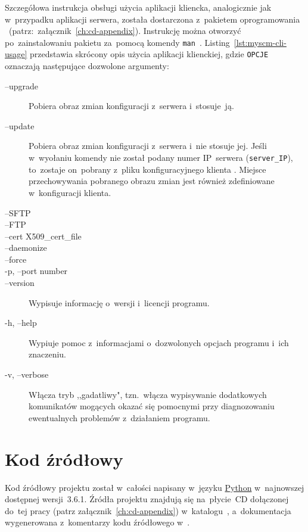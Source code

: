 \documentclass[thesis]{subfiles}
\begin{document}
Szczegółowa instrukcja obsługi użycia aplikacji kliencka, analogicznie jak w~przypadku aplikacji serwera, została dostarczona z~pakietem oprogramowania \texttt{\cliappname}~(patrz:~załącznik~\ref{ch:cd-appendix}). Instrukcję można otworzyć po~zainstalowaniu pakietu \texttt{\cliappname} za~pomocą komendy \texttt{man~\cliappname}. Listing~\ref{lst:myscm-cli-usage} przedstawia skrócony opis użycia aplikacji klienckiej, gdzie \texttt{OPCJE} oznaczają następujące dozwolone argumenty:\mynobreakpar
\begin{description}
	\item[--upgrade] Pobiera obraz zmian konfiguracji z~serwera i~stosuje~ją.
	\item[--update] Pobiera obraz zmian konfiguracji z~serwera i~nie stosuje jej. Jeśli w~wyołaniu komendy \texttt{\cliappname} nie został podany numer IP~serwera (\texttt{server\_IP}), to~zostaje on~pobrany z~pliku konfiguracyjnego klienta \myscmcliconfig. Miejsce przechowywania pobranego obrazu zmian jest również zdefiniowane w~konfiguracji klienta.
	\item[--SFTP]
	\item[--FTP]
	\item[--cert X509\_cert\_file]
	\item[--daemonize]
	\item[--force]
	\item[-p, --port number]
	\item[--version] Wypisuje informację o~wersji i~licencji programu.
	\item[-h, --help] Wypiuje pomoc z~informacjami o~dozwolonych opcjach programu i~ich znaczeniu.
	\item[-v, --verbose] Włącza tryb ,,gadatliwy", tzn.~włącza wypisywanie dodatkowych komunikatów mogących okazać się pomocnymi przy diagnozowaniu ewentualnych problemów z~działaniem programu.
\end{description}


\section{Kod źródłowy}

Kod źródłowy projektu został w~całości napisany w~języku \href{https://en.wikipedia.org/wiki/Python_(programming_language)}{Python} w~najnowszej dostępnej wersji~3.6.1. Źródła projektu znajdują się na~płycie~CD dołączonej do~tej pracy (patrz załącznik~\ref{ch:cd-appendix}) w~katalogu~, a~dokumentacja wygenerowana z~komentarzy kodu źródłowego w~.
\end{document}
